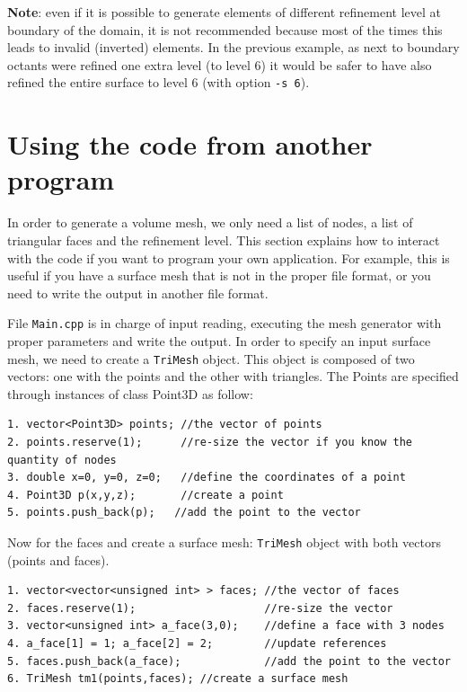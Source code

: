 \documentclass[10pt]{article}
\begin{document}
\textbf{Note}: even if it is possible to generate elements of different refinement level at boundary of the domain, it is not recommended because most of the times this leads to invalid (inverted) elements. In the previous example, as next to boundary octants were refined one extra level (to level 6) it would be safer to have also refined the entire surface to level 6 (with option \texttt{-s 6}).

\section{Using the code from another program}
\label{inside}

In order to generate a volume mesh, we only need a list of nodes, a list of triangular faces and the refinement level. This section explains how to interact with the code if you want to program your own application. For example, this is useful if you have a surface mesh that is not in the proper file format, or you need to write the output in another file format.

File \texttt{Main.cpp} is in charge of input reading, executing the mesh generator with proper parameters and write the output. In order to specify an input surface mesh, we need to create a \texttt{TriMesh} object. This object is composed of two vectors: one with the points and the other with triangles. The Points are specified through instances of class Point3D as follow:

{\small
\begin{verbatim}
1. vector<Point3D> points; //the vector of points
2. points.reserve(1);      //re-size the vector if you know the quantity of nodes
3. double x=0, y=0, z=0;   //define the coordinates of a point
4. Point3D p(x,y,z);       //create a point
5. points.push_back(p);   //add the point to the vector
\end{verbatim}
}

Now for the faces and create a surface mesh: \texttt{TriMesh} object with both vectors (points and faces).

{\small
\begin{verbatim}
1. vector<vector<unsigned int> > faces; //the vector of faces
2. faces.reserve(1);                    //re-size the vector
3. vector<unsigned int> a_face(3,0);    //define a face with 3 nodes
4. a_face[1] = 1; a_face[2] = 2;        //update references
5. faces.push_back(a_face);             //add the point to the vector
6. TriMesh tm1(points,faces); //create a surface mesh
\end{verbatim}
}
\end{document}
